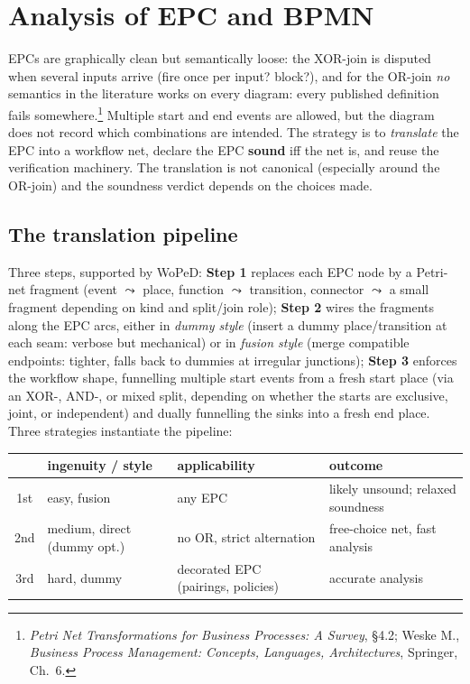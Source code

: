 \section{Analysis of EPC and BPMN}

EPCs are graphically clean but semantically loose: the XOR-join is disputed when several inputs arrive (fire once per input? block?), and for the OR-join \emph{no} semantics in the literature works on every diagram: every published definition fails somewhere.\footnote{\emph{Petri Net Transformations for Business Processes: A Survey}, §4.2; Weske M., \emph{Business Process Management: Concepts, Languages, Architectures}, Springer, Ch.~6.} Multiple start and end events are allowed, but the diagram does not record which combinations are intended. The strategy is to \emph{translate} the EPC into a workflow net, declare the EPC \textbf{sound} iff the net is, and reuse the verification machinery. The translation is not canonical (especially around the OR-join) and the soundness verdict depends on the choices made.

\subsection{The translation pipeline}

Three steps, supported by WoPeD: \textbf{Step 1} replaces each EPC node by a Petri-net fragment (event $\leadsto$ place, function $\leadsto$ transition, connector $\leadsto$ a small fragment depending on kind and split/join role); \textbf{Step 2} wires the fragments along the EPC arcs, either in \emph{dummy style} (insert a dummy place/transition at each seam: verbose but mechanical) or in \emph{fusion style} (merge compatible endpoints: tighter, falls back to dummies at irregular junctions); \textbf{Step 3} enforces the workflow shape, funnelling multiple start events from a fresh \textsf{start} place (via an XOR-, AND-, or mixed split, depending on whether the starts are exclusive, joint, or independent) and dually funnelling the sinks into a fresh \textsf{end} place. Three strategies instantiate the pipeline:
\begin{center}
\small
\begin{tabular}{clll}
\toprule
 & \textbf{ingenuity / style} & \textbf{applicability} & \textbf{outcome} \\
\midrule
1st & easy, fusion & any EPC & likely unsound; relaxed soundness \\
2nd & medium, direct (dummy opt.) & no OR, strict alternation & free-choice net, fast analysis \\
3rd & hard, dummy & decorated EPC (pairings, policies) & accurate analysis \\
\bottomrule
\end{tabular}
\end{center}


